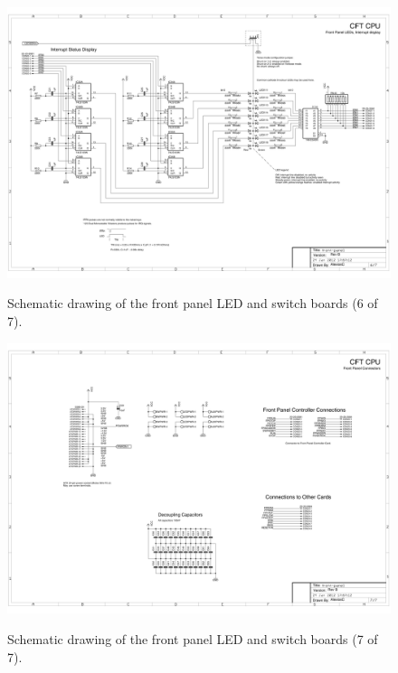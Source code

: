 \documentclass[11pt,a4paper,twocolumns]{article}
\begin{document}
\begin{figure}
\centering
\includegraphics[width=0.95\textheight,angle=90]{figs/front-panel-6.jpg}\\
\caption{\label{fig-schematic-front-panel-6}Schematic drawing of the front panel LED and switch boards (6 of 7).}
\end{figure}

\begin{figure}
\centering
\includegraphics[width=0.95\textheight,angle=90]{figs/front-panel-7.jpg}\\
\caption{\label{fig-schematic-front-panel-7}Schematic drawing of the front panel LED and switch boards (7 of 7).}
\end{figure}

\clearpage
\end{document}
